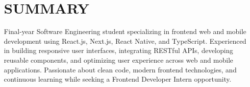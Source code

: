 \section{SUMMARY}
\noindent Final-year Software Engineering student specializing in frontend web and mobile development using React.js, Next.js, React Native, and TypeScript. Experienced in building responsive user interfaces, integrating RESTful APIs, developing reusable components, and optimizing user experience across web and mobile applications. Passionate about clean code, modern frontend technologies, and continuous learning while seeking a Frontend Developer Intern opportunity.
